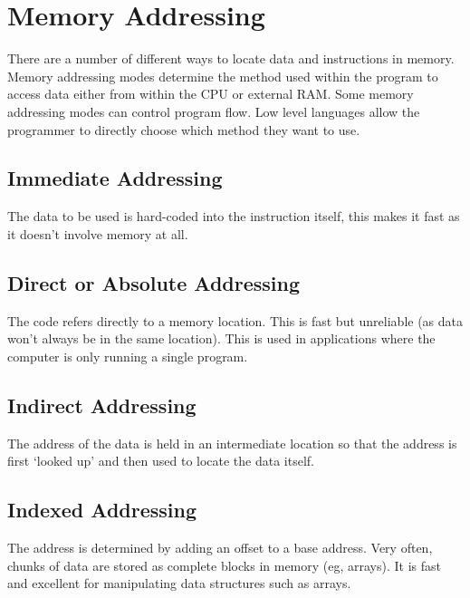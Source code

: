 \documentclass[a4paper,11pt, twocolumn]{article}
\begin{document}
\section{Memory Addressing}
There are a number of different ways to locate data and instructions in memory. Memory addressing modes determine the method used within the program to access data either from within the CPU or external RAM. Some memory addressing modes can control program flow. Low level languages allow the programmer to directly choose which method they want to use. 
\subsection{Immediate Addressing}
The data to be used is hard-coded into the instruction itself, this makes it fast as it doesn't involve memory at all.
\subsection{Direct or Absolute Addressing}
The code refers directly to a memory location. This is fast but unreliable (as data won't always be in the same location). This is used in applications where the computer is only running a single program.
\subsection{Indirect Addressing}
The address of the data is held in an intermediate location so that the address is first `looked up' and then used to locate the data itself.
\subsection{Indexed Addressing}
The address is determined by adding an offset to a base address. Very often, chunks of data are stored as complete blocks in memory (eg, arrays). It is fast and excellent for manipulating data structures such as arrays. 
\end{document}
